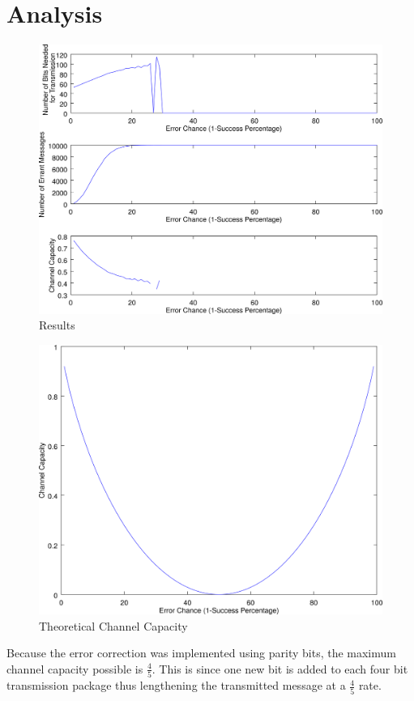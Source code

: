 \documentclass{article}
\begin{document}
   \section{Analysis}
      \begin{figure}[H]
         \includegraphics[width=\textwidth]{images/polyline288.png}
         \caption{Results}
      \end{figure}
      \begin{figure}[H]
         \includegraphics[width=\textwidth]{images/log.png}
         \caption{Theoretical Channel Capacity}
      \end{figure}
      Because the error correction was implemented using parity bits,
      the maximum channel capacity possible is $\frac{4}{5}$. This is since
      one new bit is added to each four bit transmission package thus lengthening
      the transmitted message at a $\frac{4}{5}$ rate.
\end{document}
